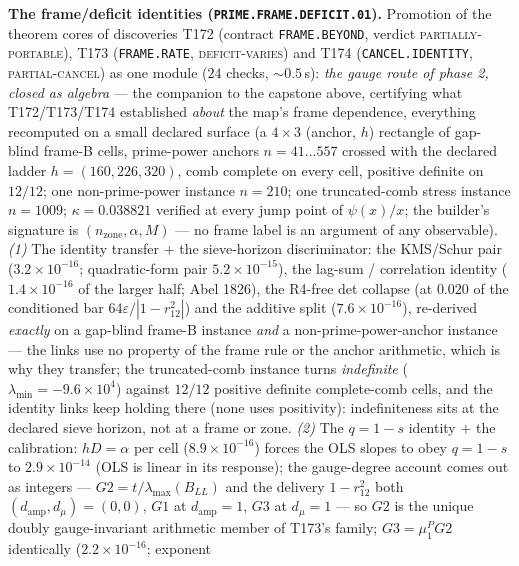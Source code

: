 \par\smallskip\noindent\textbf{The frame/deficit identities
(\texttt{PRIME.FRAME.DEFICIT.01}).}
Promotion of the theorem cores of discoveries T172 (contract
\texttt{FRAME.BEYOND}, verdict \textsc{partially-portable}), T173
(\texttt{FRAME.RATE}, \textsc{deficit-varies}) and T174
(\texttt{CANCEL.IDENTITY}, \textsc{partial-cancel}) as one module ($24$
checks, ${\sim}0.5$\,s): \emph{the gauge route of phase 2, closed as
algebra} --- the companion to the capstone above, certifying what
T172/T173/T174 established \emph{about} the map's frame dependence,
everything recomputed on a small declared surface (a $4\times3$
(anchor, $h$) rectangle of gap-blind frame-B cells, prime-power anchors
$n=41\ldots557$ crossed with the declared ladder $h=(160,226,320)$,
comb complete on every cell, positive definite on $12/12$; one
non-prime-power instance $n=210$; one truncated-comb stress instance
$n=1009$; $\kappa=0.038821$ verified at every jump point of
$\psi(x)/x$; the builder's signature is
$(n_{\mathrm{zone}},\alpha,M)$ --- no frame label is an argument of any
observable).
\emph{(1)} The identity transfer $+$ the sieve-horizon discriminator:
the KMS/Schur pair ($3.2\times10^{-16}$; quadratic-form pair
$5.2\times10^{-15}$), the lag-sum / correlation identity
($1.4\times10^{-16}$ of the larger half; Abel 1826), the R4-free det
collapse (at $0.020$ of the conditioned bar
$64\varepsilon/|1-r_{12}^2|$) and the additive split
($7.6\times10^{-16}$), re-derived \emph{exactly} on a gap-blind frame-B
instance \emph{and} a non-prime-power-anchor instance --- the links use
no property of the frame rule or the anchor arithmetic, which is why
they transfer; the truncated-comb instance turns \emph{indefinite}
($\lambda_{\min}=-9.6\times10^{4}$) against $12/12$ positive definite
complete-comb cells, and the identity links keep holding there (none
uses positivity): indefiniteness sits at the declared sieve horizon,
not at a frame or zone.
\emph{(2)} The $q=1-s$ identity $+$ the calibration: $hD=\alpha$ per
cell ($8.9\times10^{-16}$) forces the OLS slopes to obey $q=1-s$ to
$2.9\times10^{-14}$ (OLS is linear in its response); the gauge-degree
account comes out as integers --- $G2=t/\lambda_{\max}(B_{LL})$ and the
delivery $1-r_{12}^2$ both $(d_{\mathrm{amp}},d_\mu)=(0,0)$, $G1$ at
$d_{\mathrm{amp}}=1$, $G3$ at $d_\mu=1$ --- so $G2$ is the unique
doubly gauge-invariant arithmetic member of T173's family;
$G3=\mu^P_1G2$ identically ($2.2\times10^{-16}$; exponent
